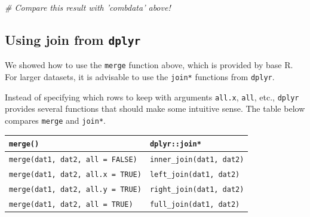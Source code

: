 \documentclass[]{book}
\newenvironment{Shaded}{\begin{snugshade}}{\end{snugshade}}
\newcommand{\CommentTok}[1]{\textcolor[rgb]{0.56,0.35,0.01}{\textit{#1}}}
\begin{document}
\begin{Shaded}
\begin{Highlighting}[]
\CommentTok{# Compare this result with 'combdata' above!}
\end{Highlighting}
\end{Shaded}

\hypertarget{dplyrjoin}{%
\subsection{\texorpdfstring{Using join from \texttt{dplyr}}{Using join from dplyr}}\label{dplyrjoin}}

We showed how to use the \texttt{merge} function above, which is provided by base R. For larger datasets, it is advisable to use the \texttt{join*} functions from \texttt{dplyr}.

Instead of specifying which rows to keep with arguments \texttt{all.x}, \texttt{all}, etc., \texttt{dplyr} provides several functions that should make some intuitive sense. The table below compares \texttt{merge} and \texttt{join*}.

\begin{longtable}[]{@{}ll@{}}
\toprule
\begin{minipage}[b]{0.48\columnwidth}\raggedright
\texttt{merge()}\strut
\end{minipage} & \begin{minipage}[b]{0.42\columnwidth}\raggedright
\texttt{dplyr::join*}\strut
\end{minipage}\tabularnewline
\midrule
\endhead
\begin{minipage}[t]{0.48\columnwidth}\raggedright
\texttt{merge(dat1,\ dat2,\ all\ =\ FALSE)}\strut
\end{minipage} & \begin{minipage}[t]{0.42\columnwidth}\raggedright
\texttt{inner\_join(dat1,\ dat2)}\strut
\end{minipage}\tabularnewline
\begin{minipage}[t]{0.48\columnwidth}\raggedright
\texttt{merge(dat1,\ dat2,\ all.x\ =\ TRUE)}\strut
\end{minipage} & \begin{minipage}[t]{0.42\columnwidth}\raggedright
\texttt{left\_join(dat1,\ dat2)}\strut
\end{minipage}\tabularnewline
\begin{minipage}[t]{0.48\columnwidth}\raggedright
\texttt{merge(dat1,\ dat2,\ all.y\ =\ TRUE)}\strut
\end{minipage} & \begin{minipage}[t]{0.42\columnwidth}\raggedright
\texttt{right\_join(dat1,\ dat2)}\strut
\end{minipage}\tabularnewline
\begin{minipage}[t]{0.48\columnwidth}\raggedright
\texttt{merge(dat1,\ dat2,\ all\ =\ TRUE)}\strut
\end{minipage} & \begin{minipage}[t]{0.42\columnwidth}\raggedright
\texttt{full\_join(dat1,\ dat2)}\strut
\end{minipage}\tabularnewline
\bottomrule
\end{longtable}
\end{document}
